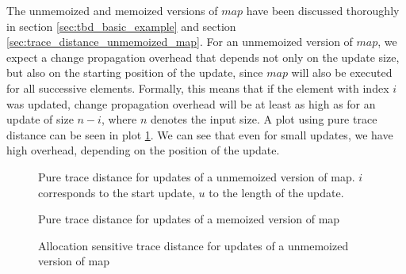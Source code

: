 The unmemoized and memoized versions of $map$ have been discussed thoroughly in section \ref{sec:tbd_basic_example} and section \ref{sec:trace_distance_unmemoized_map}. For an unmemoized version of $map$, we expect a change propagation overhead that depends not only on the update size, but also on the starting position of the update, since $map$ will also be executed for all successive elements. Formally, this means that if the element with index $i$ was updated, change propagation overhead will be at least as high as for an update of size $n-i$, where $n$ denotes the input size. A plot using pure trace distance can be seen in plot \ref{plot:unmemoized_map_pure}. We can see that even for small updates, we have high overhead, depending on the position of the update. 

\begin{figure}
\centering
{}
\caption{Pure trace distance for updates of a unmemoized version of map. $i$ corresponds to the start update, $u$ to the length of the update.}
\label{plot:unmemoized_map_pure}
\end{figure}


\begin{figure}
\centering
{}
\caption{Pure trace distance for updates of a memoized version of map}
\label{plot:memoized_map_pure}
\end{figure}


\begin{figure}
\centering
{}
\caption{Allocation sensitive trace distance for updates of a unmemoized version of map}
\label{plot:unmemoized_map_alloc}
\end{figure}

